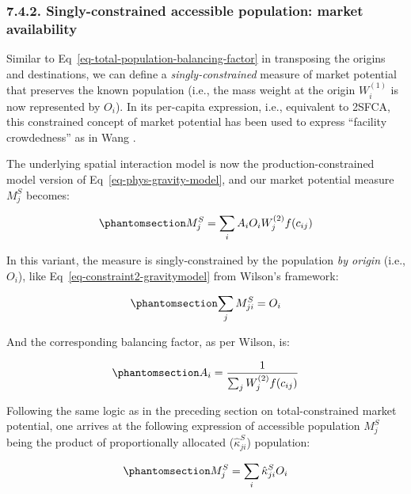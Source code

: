 \documentclass[
  10pt,
  letterpaper,
]{article}
\begin{document}
\subsubsection{7.4.2. Singly-constrained accessible population: market
availability}\label{singly-constrained-accessible-population-market-availability}

Similar to Eq~\ref{eq-total-population-balancing-factor} in transposing
the origins and destinations, we can define a \emph{singly-constrained}
measure of market potential that preserves the known population (i.e.,
the mass weight at the origin \(W_i^{(1)}\) is now represented by
\(O_i\)). In its per-capita expression, i.e., equivalent to 2SFCA, this
constrained concept of market potential has been used to express
``facility crowdedness'' as in Wang \citep{wang_inverted_2018}.

The underlying spatial interaction model is now the
production-constrained model version of Eq~\ref{eq-phys-gravity-model},
and our market potential measure \(M^S_j\) becomes:

\begin{equation}\phantomsection\label{eq-population-constrained-accessibility}{
M^S_j = \sum_i A_i O_i W_j^{(2)} f(c_{ij})
}\end{equation}

In this variant, the measure is singly-constrained by the population
\emph{by origin} (i.e., \(O_i\)), like
Eq~\ref{eq-constraint2-gravitymodel} from Wilson's framework:

\begin{equation}\phantomsection\label{eq-population-constraint}{
\sum_j M^S_{ji} =  O_i 
}\end{equation}

And the corresponding balancing factor, as per Wilson, is:

\begin{equation}\phantomsection\label{eq-population-constrained-proportionality-constants}{
A_i = \frac{1}{\sum_j W_j^{(2)} f(c_{ij})}
}\end{equation}

Following the same logic as in the preceding section on
total-constrained market potential, one arrives at the following
expression of accessible population \(M_j^S\) being the product of
proportionally allocated (\(\hat \kappa^S_{ji}\)) population:

\begin{equation}\phantomsection\label{eq-production-constrained-accessibility-with-proportional-allocation-factor}{
M^S_{j} = \sum_i \hat \kappa^S_{ji} O_i
}\end{equation}
\end{document}

